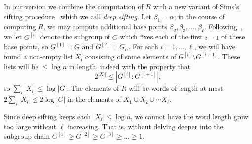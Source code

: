 \documentclass[12pt]{article}
\begin{document}
In our version we combine the computation of $R$ with a new variant
of Sims's sifting procedure~\cite{sims1970computational,sims1971computation,FurstHopcroftLuks1980,babai1991nearly,cooperman1990random,cooperman1992fast}
which we call {\em deep sifting}.  Let $\beta_1=\alpha$;
in the course of computing $R$, we may compute additional
base points $\beta_2,\beta_3,\ldots,\beta_\ell$.  
Following~\cite[Section 4.1]{seress-book},
we let $G^{[i]}$ denote the subgroup of $G$ which fixes
each of the first $i-1$ of these base points, so $G^{[1]}=G$
and $G^{[2]}=G_\alpha$.  For each $i=1,\ldots,\ell$,
we will have found a non-empty list
$X_i$ consisting of some elements of $G^{[i]}\setminus G^{[i+1]}$.
These lists will be $\leq \log n$ in length,
indeed with the property that
$$2^{|X_i|}\leq |G^{[i]}:G^{[i+1]}|,$$
so
$\sum_i|X_i|\leq\log|G|$.  The elements of
$R$ will be words of length at most $2\sum_i|X_i|\leq 2\log|G|$
in the elements of $X_1\cup X_2\cup\cdots X_\ell$.

Since deep sifting keeps each $|X_i|\leq\log n$, we cannot have
the word length grow too large without $\ell$ increasing.
That is, without
delving deeper into
the subgroup chain
$G^{[1]}\geq G^{[2]}\geq G^{[3]}\geq \ldots\geq 1$.
\end{document}
